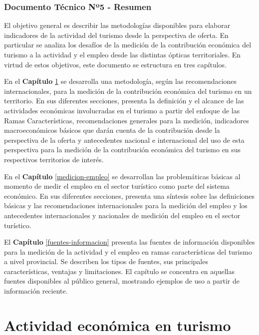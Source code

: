 \documentclass[
  openany]{book}
\begin{document}
\hypertarget{documento-tuxe9cnico-nuxba5---resumen}{%
\subsection*{Documento Técnico Nº5 - Resumen}\label{documento-tuxe9cnico-nuxba5---resumen}}

El objetivo general es describir las metodologías disponibles para elaborar indicadores de la actividad del turismo desde la perspectiva de oferta. En particular se analiza los desafíos de la medición de la contribución económica del turismo a la actividad y el empleo desde las distintas ópticas territoriales. En virtud de estos objetivos, este documento se estructura en tres capítulos.

En el \textbf{Capítulo} \ref{medicion-actividad} se desarrolla una metodología, según las recomendaciones internacionales, para la medición de la contribución económica del turismo en un territorio. En sus diferentes secciones, presenta la definición y el alcance de las actividades económicas involucradas en el turismo a partir del enfoque de las Ramas Características, recomendaciones generales para la medición, indicadores macroeconómicos básicos que darán cuenta de la contribución desde la perspectiva de la oferta y antecedentes nacional e internacional del uso de esta perspectiva para la medición de la contribución económica del turismo en sus respectivos territorios de interés.

En el \textbf{Capítulo} \ref{medicion-empleo} se desarrollan las problemáticas básicas al momento de medir el empleo en el sector turístico como parte del sistema económico. En sus diferentes secciones, presenta una síntesis sobre las definiciones básicas y las recomendaciones internacionales para la medición del empleo y los antecedentes internacionales y nacionales de medición del empleo en el sector turístico.

El \textbf{Capítulo} \ref{fuentes-informacion} presenta las fuentes de información disponibles para la medición de la actividad y el empleo en ramas características del turismo a nivel provincial. Se describen los tipos de fuentes, sus principales características, ventajas y limitaciones. El capítulo se concentra en aquellas fuentes disponibles al público general, mostrando ejemplos de uso a partir de información reciente.

\hypertarget{medicion-actividad}{%
\chapter{\texorpdfstring{\textbf{Actividad económica en turismo}}{Actividad económica en turismo}}\label{medicion-actividad}}
\end{document}
